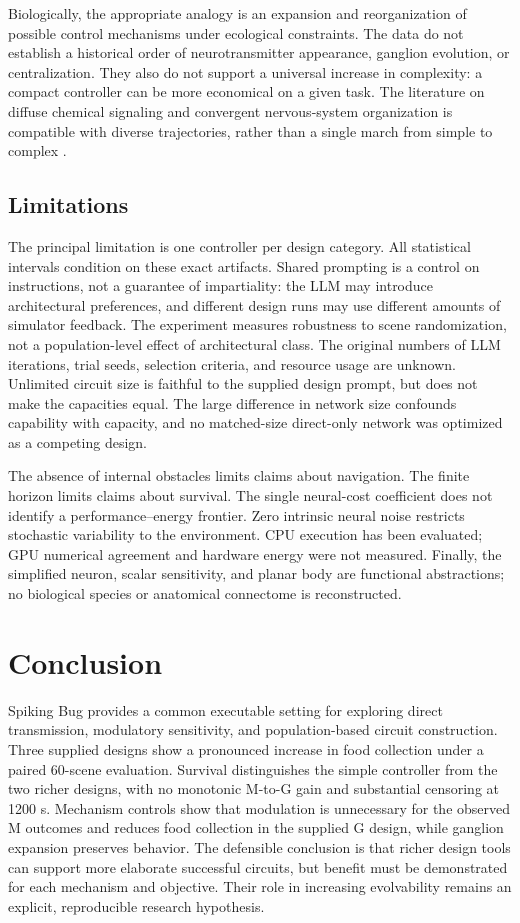 \documentclass[11pt]{article}
\begin{document}
Biologically, the appropriate analogy is an expansion and reorganization of possible control mechanisms under ecological constraints. The data do not establish a historical order of neurotransmitter appearance, ganglion evolution, or centralization. They also do not support a universal increase in complexity: a compact controller can be more economical on a given task. The literature on diffuse chemical signaling and convergent nervous-system organization is compatible with diverse trajectories, rather than a single march from simple to complex \citep{jekely2021,martin2018}.

\subsection{Limitations}
The principal limitation is one controller per design category. All statistical intervals condition on these exact artifacts. Shared prompting is a control on instructions, not a guarantee of impartiality: the LLM may introduce architectural preferences, and different design runs may use different amounts of simulator feedback. The experiment measures robustness to scene randomization, not a population-level effect of architectural class. The original numbers of LLM iterations, trial seeds, selection criteria, and resource usage are unknown. Unlimited circuit size is faithful to the supplied design prompt, but does not make the capacities equal. The large difference in network size confounds capability with capacity, and no matched-size direct-only network was optimized as a competing design.

The absence of internal obstacles limits claims about navigation. The finite horizon limits claims about survival. The single neural-cost coefficient does not identify a performance--energy frontier. Zero intrinsic neural noise restricts stochastic variability to the environment. CPU execution has been evaluated; GPU numerical agreement and hardware energy were not measured. Finally, the simplified neuron, scalar sensitivity, and planar body are functional abstractions; no biological species or anatomical connectome is reconstructed.

\section{Conclusion}
Spiking Bug provides a common executable setting for exploring direct transmission, modulatory sensitivity, and population-based circuit construction. Three supplied designs show a pronounced increase in food collection under a paired 60-scene evaluation. Survival distinguishes the simple controller from the two richer designs, with no monotonic M-to-G gain and substantial censoring at 1200 s. Mechanism controls show that modulation is unnecessary for the observed M outcomes and reduces food collection in the supplied G design, while ganglion expansion preserves behavior. The defensible conclusion is that richer design tools can support more elaborate successful circuits, but benefit must be demonstrated for each mechanism and objective. Their role in increasing evolvability remains an explicit, reproducible research hypothesis.
\end{document}

